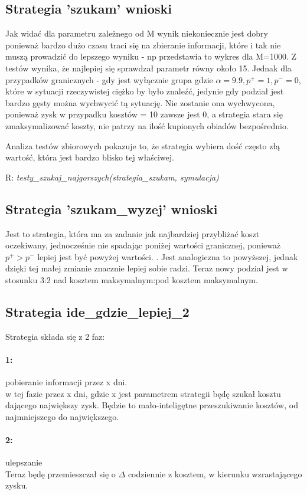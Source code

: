 \documentclass{article}
\begin{document}
\subsection{Strategia 'szukam' wnioski}   
Jak widać dla parametru zależnego od M wynik niekoniecznie jest dobry ponieważ bardzo dużo czasu traci się na 
zbieranie informacji, które i tak nie muszą prowadzić do lepszego wyniku - np przedstawia to wykres dla M=1000.
Z testów wynika, że najlepiej się sprawdzał parametr równy około 15. Jednak dla przypadków granicznych - gdy jest wyłącznie
grupa gdzie $\alpha = 9.9, p^+ = 1, p^- = 0$, które w sytuacji rzeczywistej ciężko by było znaleźć, jedynie gdy podział jest bardzo
gęsty można wychwycić tą sytuację. Nie zostanie ona wychwycona, ponieważ zysk w przypadku kosztów = 10 zawsze jest 0, a
strategia stara się zmaksymalizować koszty, nie patrzy na ilość kupionych obiadów bezpośrednio.

Analiza testów zbiorowych pokazuje to, że strategia wybiera dość często złą wartość, która jest bardzo blisko tej właściwej.


R: \textit{testy\_szukaj\_najgorszych(strategia\_szukam, symulacja)}
\subsection{Strategia 'szukam\_wyzej' wnioski}

Jest to strategia, która ma za zadanie jak najbardziej przybliżać koszt oczekiwany, jednocześnie nie 
spadając poniżej wartości granicznej, ponieważ $p^+ > p^-$ lepiej jest być powyżej wartości.
. Jest analogiczna to powyższej, jednak dzięki tej małej zmianie znacznie lepiej sobie radzi.
Teraz nowy podział jest w stosunku 3:2 nad kosztem maksymalnym:pod kosztem maksymalnym.

\subsection{Strategia ide\_gdzie\_lepiej\_2}
Strategia składa się z 2 faz:
\paragraph{1:} pobieranie informacji przez x dni.\\
w tej fazie przez x dni, gdzie x jest parametrem strategii będę szukał kosztu dającego największy zysk.
Będzie to mało-inteligętne przeszukiwanie kosztów, od najmniejszego do największego.
\paragraph{2:} ulepszanie\\
Teraz będę przemieszczał się o $\Delta$ codziennie z kosztem, w kierunku wzrastającego zysku.
\end{document}
